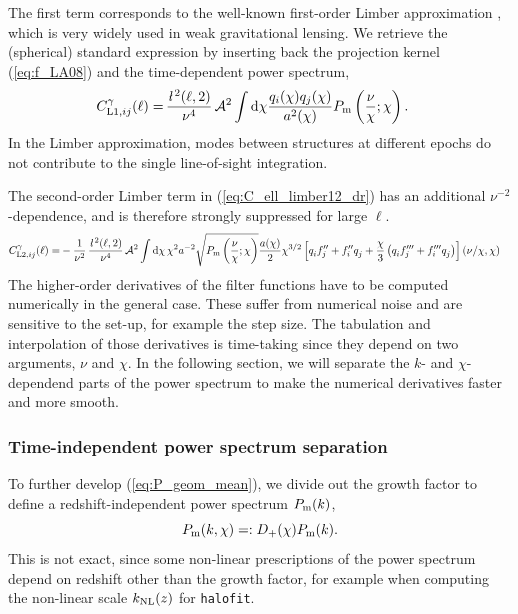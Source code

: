 \documentclass[fleqn,usenatbib]{mnras} %
\newcommand{\ellbar}{\hbox{\it \l}\,}
\newcommand{\pref}{{\cal A}}
\begin{document}
%
The first term corresponds to the well-known first-order Limber approximation
\cite{1953ApJ...117..134L,1992ApJ...388..272K}, which is very widely used in
weak gravitational lensing. We retrieve the (spherical) standard expression by
inserting back the projection kernel (\ref{eq:f_LA08}) and the time-dependent
power spectrum,
%
\begin{align}
  C^\gamma_{{\rm L1}, ij}(\ell) = & \, \frac{\ellbar^2(\ell, 2)}{\nu^4} \, \pref^2 \int {\rm d} \chi \frac{ q_i(\chi) q_j(\chi) }{a^2(\chi)}
  P_{\rm m}\left(\frac{\nu}{\chi}; \chi\right).
  \label{eq:C_ell_limber1}
\end{align}
%
In the Limber approximation, modes between structures at different epochs do
not contribute to the single line-of-sight integration.

The second-order Limber term in (\ref{eq:C_ell_limber12_dr}) has an additional
$\nu^{-2}$-dependence, and is therefore strongly suppressed for large $\ell$.
%
\begin{align}
  C^\gamma_{{\rm L2}, ij}(\ell) = & - \frac 1 {\nu^2} \, \frac{\ellbar^2(\ell, 2)}{\nu^4} \, \pref^2
    \int {\rm d} \chi \, \chi^{2} a^{-2} \sqrt{P_{\rm m}\left(\frac\nu\chi; \chi\right)}
    \frac{a(\chi)}{2} \chi^{3/2} \left[ q^{}_i f^{\prime\prime}_j + f^{\prime\prime}_i q^{}_j
      + \frac{\chi}{3} \left( q^{}_i f^{\prime\prime\prime}_j + f^{\prime\prime\prime}_i q^{}_j
      \right)
    \right](\nu/\chi, \chi)
  \label{eq:C_ell_limber2_dr} 
\end{align}
%
The higher-order derivatives of the filter functions have to be computed
numerically in the general case. These suffer from numerical noise and are
sensitive to the set-up, for example the step size. The tabulation and
interpolation of those derivatives is time-taking since they depend on two
arguments, $\nu$ and $\chi$. In the following section, we will separate the
$k$- and $\chi$-dependend parts of the power spectrum to make the numerical
derivatives faster and more smooth.

\subsubsection{Time-independent power spectrum separation}

To further develop (\ref{eq:P_geom_mean}), we divide out the growth factor to
define a redshift-independent power spectrum $P_{\rm m}(k)$,
%
\begin{equation}
 P_{\rm m}(k, \chi) =: D_+(\chi) P_{\rm m}(k).
  \label{eq:P_k_chi_sep_s}
\end{equation}
%
This is not exact, since some non-linear prescriptions of the power spectrum
depend on redshift other than the growth factor, for example when computing the
non-linear scale $k_{\rm NL}(z)$ for \texttt{halofit}.
\end{document}
